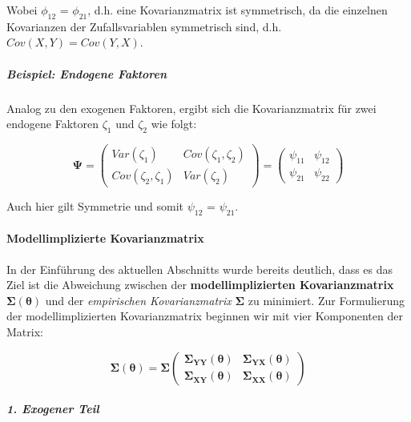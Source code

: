\documentclass{article}
\numberwithin{equation}{section}
\begin{document}
Wobei $\phi_{12}$ = $\phi_{21}$, d.h. eine Kovarianzmatrix ist symmetrisch, da die einzelnen Kovarianzen der Zufallsvariablen symmetrisch sind, d.h. $Cov(X,Y) = Cov(Y,X)$.

\subparagraph{Beispiel: Endogene Faktoren}

Analog zu den exogenen Faktoren, ergibt sich die Kovarianzmatrix für zwei endogene Faktoren $\zeta_1$ und $\zeta_2$ wie folgt:

\begin{equation}
\boldsymbol\Psi =
\begin{pmatrix}
Var(\zeta_1) & Cov(\zeta_1,\zeta_2)\\
Cov(\zeta_2,\zeta_1) & Var(\zeta_2)
\end{pmatrix} =
\begin{pmatrix}
\psi_{11} & \psi_{12}\\
\psi_{21} & \psi_{22}
\end{pmatrix}
\end{equation}

Auch hier gilt Symmetrie und somit $\psi_{12}$ = $\psi_{21}$.

\paragraph*{Modellimplizierte Kovarianzmatrix}

In der Einführung des aktuellen Abschnitts wurde bereits deutlich, dass es das Ziel ist die Abweichung zwischen der \textbf{modellimplizierten Kovarianzmatrix} $\boldsymbol{\Sigma(\theta)}$ und der \emph{empirischen Kovarianzmatrix} $\boldsymbol\Sigma$ zu minimiert. Zur Formulierung der modellimplizierten Kovarianzmatrix beginnen wir mit vier Komponenten der Matrix:

\begin{equation}
\boldsymbol{\Sigma(\theta)} = \boldsymbol\Sigma
\begin{pmatrix}
\boldsymbol\Sigma_{\mathbf{YY}}(\boldsymbol\theta) & \boldsymbol\Sigma_{\mathbf{YX}}(\boldsymbol\theta)\\
\boldsymbol\Sigma_{\mathbf{XY}}(\boldsymbol\theta) & \boldsymbol\Sigma_{\mathbf{XX}}(\boldsymbol\theta)
\end{pmatrix}
\end{equation}

\subparagraph*{1. Exogener Teil}
\end{document}
